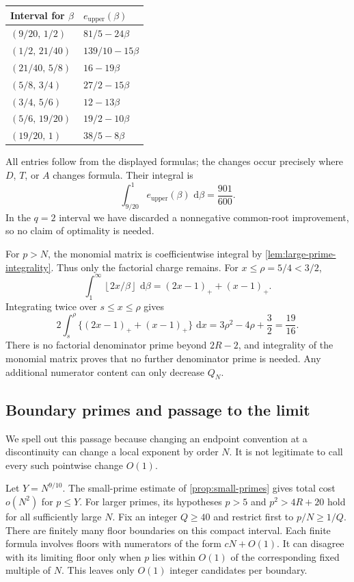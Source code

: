 \documentclass[11pt,letterpaper]{article}
\theoremstyle{definition}
\newcommand{\dd}{\,\mathrm d}
\newcommand{\floor}[1]{\left\lfloor #1\right\rfloor}
\begin{document}
\begin{center}
\begin{tabular}{@{}ll@{}}
\toprule
Interval for $\beta$ & $e_{\mathrm{upper}}(\beta)$\\
\midrule
$(9/20,\,1/2)$ & $81/5-24\beta$\\
$(1/2,\,21/40)$ & $139/10-15\beta$\\
$(21/40,\,5/8)$ & $16-19\beta$\\
$(5/8,\,3/4)$ & $27/2-15\beta$\\
$(3/4,\,5/6)$ & $12-13\beta$\\
$(5/6,\,19/20)$ & $19/2-10\beta$\\
$(19/20,\,1)$ & $38/5-8\beta$\\
\bottomrule
\end{tabular}
\end{center}

All entries follow from the displayed formulas; the changes occur precisely
where $D$, $T$, or $A$ changes formula. Their integral is
\begin{equation}\label{eq:upper-table-area}
 \int_{9/20}^{1}e_{\mathrm{upper}}(\beta)\,\dd\beta
 =\frac{901}{600}.
\end{equation}
In the $q=2$ interval we have discarded a nonnegative common-root
improvement, so no claim of optimality is needed.

For $p>N$, the monomial matrix is coefficientwise integral by
\cref{lem:large-prime-integrality}. Thus only the factorial charge remains.
For $x\le\rho=5/4<3/2$,
\[
 \int_1^\infty\floor{2x/\beta}\,\dd\beta
 =(2x-1)_++(x-1)_+.
\]
Integrating twice over $s\le x\le\rho$ gives
\begin{equation}\label{eq:large-prime-area}
 2\int_s^\rho\{(2x-1)_++(x-1)_+\}\,\dd x
 =3\rho^2-4\rho+\frac32=\frac{19}{16}.
\end{equation}
There is no factorial denominator prime beyond $2R-2$, and integrality
of the monomial matrix proves that no further denominator prime is needed.
Any additional numerator content can only decrease $Q_N$.

\subsection{Boundary primes and passage to the limit}
We spell out this passage because changing an endpoint convention at a
discontinuity can change a local exponent by order $N$.
It is not legitimate to call every such pointwise change $O(1)$.

Let $Y=N^{9/10}$. The small-prime estimate of
\cref{prop:small-primes} gives total cost $o(N^2)$ for $p\le Y$.
For larger primes, its hypotheses $p>5$ and $p^2>4R+20$ hold for all
sufficiently large $N$. Fix an integer $Q\ge40$ and restrict first to
$p/N\ge1/Q$. There are finitely many floor boundaries on this compact
interval. Each finite formula involves floors with numerators of the form
$cN+O(1)$. It can disagree with its limiting floor only when $p$ lies within
$O(1)$ of the corresponding fixed multiple of $N$. This leaves only $O(1)$
integer candidates per boundary.
\end{document}
